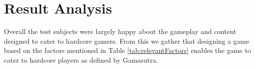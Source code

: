 \section{Result Analysis}
Overall the test subjects were largely happy about the gameplay and content designed to cater to hardcore gamers.
From this we gather that designing a game based on the factors mentioned in Table \ref{tab:relevantFactors} enables the game to cater to hardcore players as defined by Gamasutra\cite{casual_vs_hardcore}.